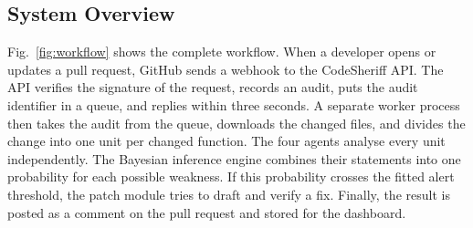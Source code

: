 \documentclass[conference]{IEEEtran}
\begin{document}
\subsection{System Overview}
\label{subsec:overview}

Fig.~\ref{fig:workflow} shows the complete workflow. When a developer
opens or updates a pull request, GitHub sends a webhook to the CodeSheriff
API. The API verifies the signature of the request, records an audit, puts
the audit identifier in a queue, and replies within three seconds. A
separate worker process then takes the audit from the queue, downloads the
changed files, and divides the change into one unit per changed function.
The four agents analyse every unit independently. The Bayesian inference
engine combines their statements into one probability for each possible
weakness. If this probability crosses the fitted alert threshold, the
patch module tries to draft and verify a fix. Finally, the result is posted
as a comment on the pull request and stored for the dashboard.
\end{document}
